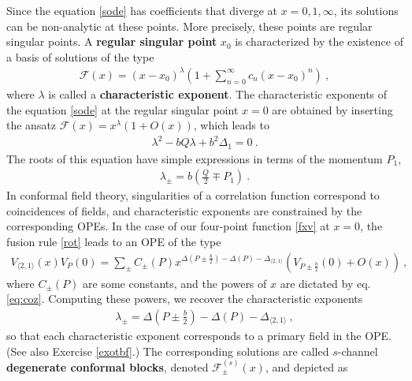 \documentclass[12pt, a4paper, notitlepage, twoside]{report}
\numberwithin{equation}{section}
\theoremstyle{break}
\begin{document}
Since the equation \eqref{sode} has coefficients that diverge at $x=0,1,\infty$, its solutions can be non-analytic at these points. 
More precisely, these points are regular singular points.
A \textbf{regular singular point} $x_0$ is characterized by the existence of a basis of solutions of the type  
\begin{align}
 \mathcal{F}(x)=(x-x_0)^\lambda\left(1+\sum_{n=0}^\infty c_n (x-x_0)^n\right)\ ,
\label{zxl}
\end{align}
where $\lambda$ is called a \textbf{\boldmath characteristic exponent}.
The characteristic exponents of the equation \eqref{sode} at the regular singular point $x=0$ are obtained by inserting the ansatz $\mathcal{F}(x) = x^\lambda(1+O(x))$, which leads to 
\begin{align}
 \lambda^2 - bQ\lambda + b^2 \Delta_1 = 0 \ .
\end{align}
The roots of this equation have simple expressions in terms of the momentum $P_1$,
\begin{align}
 \lambda_\pm = b\left(\frac{Q}{2}\mp P_1\right) \ .
\label{lpm}
\end{align}
In conformal field theory, singularities of a correlation function correspond to coincidences of fields, and characteristic exponents are constrained by the corresponding OPEs.
In the case of our four-point function \eqref{fxv} at $x=0$, the fusion rule \eqref{rot} leads to an OPE of the type
\begin{align}
 V_{\langle 2,1 \rangle}(x)V_{P}(0) = \sum_\pm C_\pm(P) x^{\Delta\left(P\pm \frac{b}{2}\right) -\Delta(P) - \Delta_{\langle 2,1 \rangle}} \left(V_{P\pm\frac{b}{2}}(0) + O(x)\right)\ ,
\end{align}
where $C_\pm(P)$ are some constants, and the powers of $x$ are dictated by eq. \eqref{eq:coz}. 
Computing these powers, we recover the characteristic exponents
\begin{align}
 \lambda_\pm = \Delta\left(P\pm \frac{b}{2}\right) -\Delta(P) - \Delta_{\langle 2,1 \rangle} \ ,
\end{align}
so that each characteristic exponent corresponds to a primary field in the OPE.
(See also Exercise \ref{exotbf}.) The corresponding solutions are called $s$-channel \textbf{degenerate conformal blocks}, denoted $\mathcal{F}^{(s)}_\pm(x)$, and depicted as
\end{document}
